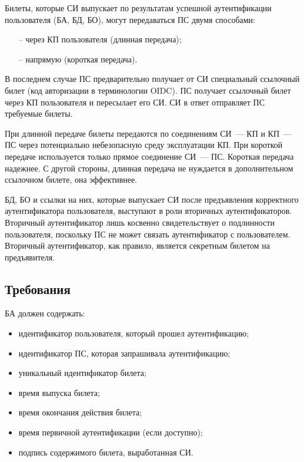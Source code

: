 Билеты, которые СИ выпускает по результатам успешной аутентификации 
пользователя (БА, БД, БО), могут передаваться ПС двумя способами:
\begin{itemize}
\item[--]
через КП пользователя (длинная передача);
\item[--]
напрямую (короткая передача).
\end{itemize}

В последнем случае ПС предварительно получает от СИ специальный ссылочный билет
(код авторизации в терминологии OIDC).
%
ПС получает ссылочный билет через КП пользователя и пересылает его СИ.
СИ в ответ отправляет ПС требуемые билеты.

При длинной передаче билеты передаются по соединениям
СИ~--- КП и КП~--- ПС через потенциально небезопасную 
среду эксплуатации КП. При короткой передаче используется
только прямое соединение СИ~--- ПС. Короткая передача надежнее.
С другой стороны, длинная передача не нуждается в дополнительном ссылочном 
билете, она эффективнее.

БД, БО и ссылки на них, которые выпускает СИ после предъявления корректного 
аутентификатора пользователя, выступают в роли вторичных аутентификаторов.
%
Вторичный аутентификатор лишь косвенно свидетельствует о подлинности 
пользователя, поскольку ПС не может связать аутентификатор с пользователем. 
%
Вторичный аутентификатор, как правило, является секретным билетом на 
предъявителя.

\subsection{Требования}\label{TM.Reqs}


БА должен содержать:
\begin{itemize}
\item
идентификатор пользователя, который прошел аутентификацию;
\item
идентификатор ПС, которая запрашивала аутентификацию;
\item
уникальный идентификатор билета;
\item
время выпуска билета;
\item
время окончания действия билета;
\item
время первичной аутентификации (если доступно);
\item
подпись содержимого билета, выработанная СИ.
\end{itemize}

